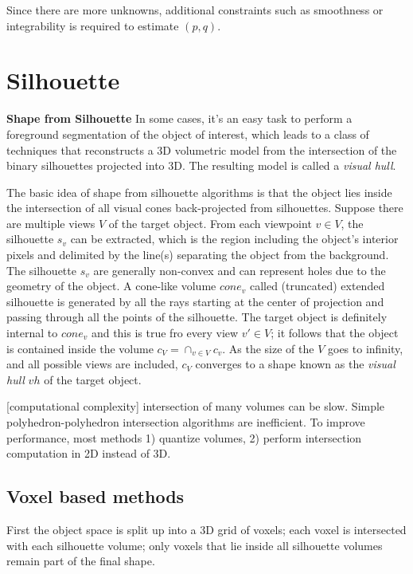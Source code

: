 Since there are more unknowns, additional constraints such as smoothness or integrability is required to estimate $(p, q)$.

\section{Silhouette}
\textbf{Shape from Silhouette}
In some cases, it's an easy task to perform a foreground segmentation of the object of interest, which leads to a class of techniques that reconstructs a 3D volumetric model from the intersection of the binary silhouettes projected into 3D. The resulting model is called a \textit{visual hull}.

The basic idea of shape from silhouette algorithms is that the object lies inside the intersection of all visual cones back-projected from silhouettes. Suppose there are multiple views $V$ of the target object. From each viewpoint $v\in V$, the silhouette $s_v$ can be extracted, which is the region including the object's interior pixels and delimited by the line(s) separating the object from the background. The silhouette $s_v$ are generally non-convex and can represent holes due to the geometry of the object. A cone-like volume $cone_v$ called (truncated) extended silhouette is generated by all the rays starting at the center of projection and passing through all the points of the silhouette. The target object is definitely internal to $cone_v$ and this is true fro every view $v'\in V$; it follows that the object is contained inside the volume $c_V=\cap_{v\in V}c_v$. As the size of the $V$ goes to infinity, and all possible views are included, $c_V$ converges to a shape known as the \textit{visual hull} $vh$ of the target object.


[computational complexity] intersection of many volumes can be slow. Simple polyhedron-polyhedron intersection algorithms are inefficient. To improve performance, most methods 1) quantize volumes, 2) perform intersection computation in 2D instead of 3D.

\subsection{Voxel based methods}
First the object space is split up into a 3D grid of voxels; each voxel is intersected with each silhouette volume; only voxels that lie inside all silhouette volumes remain part of the final shape.


